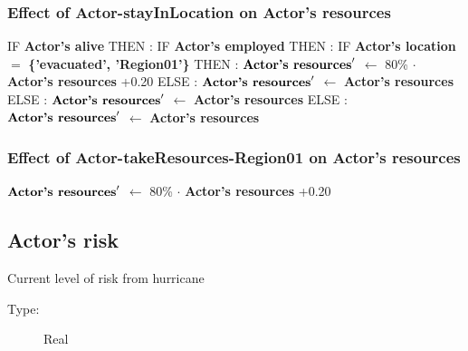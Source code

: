 \documentclass{article}%
\begin{document}
%
\subsubsection{Effect of Actor{-}stayInLocation on Actor's resources}%
\label{ssubsec:Effect of Actor{-}stayInLocation on Actor's resources}%
\begin{flushleft}%
IF %
\textbf{Actor's alive}%
\linebreak%
\hspace*{2em}%
THEN %
: %
IF %
\textbf{Actor's employed}%
\linebreak%
\hspace*{4em}%
THEN %
: %
IF %
\textbf{Actor's location}%
$=$%
\textbf{\{'evacuated', 'Region01'\}}%
\linebreak%
\hspace*{6em}%
THEN %
: %
$\mbox{\textbf{Actor's resources}} '$%
$\leftarrow$%
80\%%
$\cdot$%
\textbf{Actor's resources}%
+0.20%
\linebreak%
\hspace*{6em}%
ELSE %
: %
$\mbox{\textbf{Actor's resources}} '$%
$\leftarrow$%
\textbf{Actor's resources}%
\linebreak%
\hspace*{4em}%
ELSE %
: %
$\mbox{\textbf{Actor's resources}} '$%
$\leftarrow$%
\textbf{Actor's resources}%
\linebreak%
\hspace*{2em}%
ELSE %
: %
$\mbox{\textbf{Actor's resources}} '$%
$\leftarrow$%
\textbf{Actor's resources}%
\end{flushleft}

%
\subsubsection{Effect of Actor{-}takeResources{-}Region01 on Actor's resources}%
\label{ssubsec:Effect of Actor{-}takeResources{-}Region01 on Actor's resources}%
\begin{flushleft}%
$\mbox{\textbf{Actor's resources}} '$%
$\leftarrow$%
80\%%
$\cdot$%
\textbf{Actor's resources}%
+0.20%
\end{flushleft}

%
\subsection{Actor's risk}%
\label{subsec:Actor's risk}%
Current level of risk from hurricane%
\begin{description}%
\item[Type:]%
Real%
\end{description}%
\end{document}

